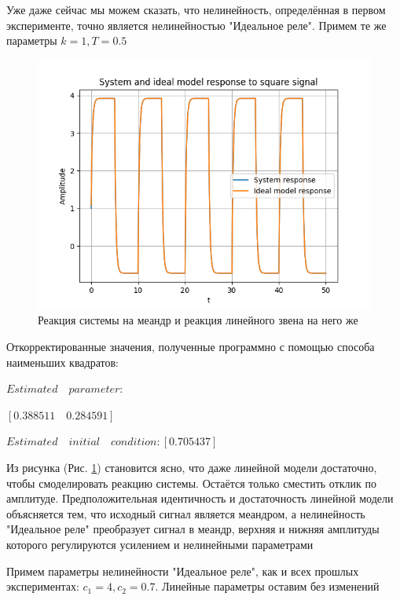 Уже даже сейчас мы можем сказать, что нелинейность, определённая в первом эксперименте, точно является нелинейностью "Идеальное реле". Примем те же параметры $ k = 1, T = 0.5 $

\begin{figure}[H]
	\centering
	\includegraphics[width=0.7\linewidth]{body/images/System-and-ideal-model-response-to-square-signal.png}
	\caption{Реакция системы на меандр и реакция линейного звена на него же}
	\label{fig:12}
\end{figure}

Откорректированные значения, полученные программно с помощью способа наименьших квадратов:

$Estimated\quad parameter:$

\qquad$[0.388511\quad 0.284591]$

$Estimated\quad initial\quad condition: [0.705437]$

Из рисунка (Рис. \ref{fig:12}) становится ясно, что даже линейной модели достаточно, чтобы смоделировать реакцию системы. Остаётся только сместить отклик по амплитуде.
Предположительная идентичность и достаточность линейной модели объясняется тем, что исходный сигнал является меандром, а нелинейность "Идеальное реле" преобразует сигнал в меандр,
верхняя и нижняя амплитуды которого регулируются усилением и нелинейными параметрами

Примем параметры нелинейности "Идеальное реле", как и всех прошлых экспериментах: $ c_1 = 4, c_2 = 0.7 $. Линейные параметры оставим без изменений

